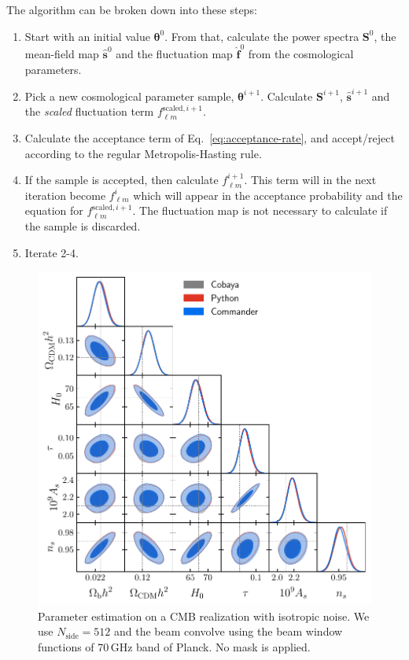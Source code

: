 \documentclass[twocolumn]{../common/aa}
\begin{document}
The algorithm can be broken down into these steps:
\begin{enumerate}
    \item Start with an initial value $\boldsymbol{\theta}^0$. From that, calculate the power spectra $\boldsymbol{S}^0$, the mean-field map $\boldsymbol{\hat{s}}^0$ and the fluctuation map $\boldsymbol{\hat{f}}^0$ from the cosmological parameters.
    \item Pick a new cosmological parameter sample, $\boldsymbol{\theta}^{i+1}$. Calculate $\boldsymbol{S}^{i+1}$, $\boldsymbol{\hat{s}}^{i+1}$ and the \textit{scaled} fluctuation term $f_{\ell m}^{\textrm{scaled}, i+1}$.
    \item Calculate the acceptance term of Eq.~\ref{eq:acceptance-rate}, and accept/reject according to the regular Metropolis-Hasting rule.
    \item If the sample is accepted, then calculate $f_{\ell m}^{i+1}$. This term will in the next iteration become $f_{\ell m}^{i}$ which will appear in the acceptance probability and the equation for $f_{\ell m}^{\textrm{scaled}, i+1}$. The fluctuation map is not necessary to calculate if the sample is discarded.
    \item Iterate 2-4.
\end{enumerate}

\begin{figure}
	\centering
	\includegraphics[width=\linewidth]{figures/dist_posterior_no_mask.pdf}
	\caption{\label{fig:nomask}Parameter estimation on a CMB realization with isotropic noise. We use $N_{\mathrm{side}}=512$ and the beam convolve using the beam window functions of 70\,GHz band of Planck. No mask is applied.}
\end{figure}
\end{document}
